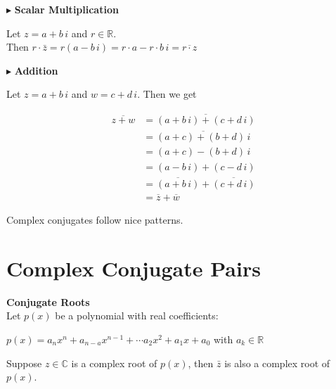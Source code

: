 \documentclass{ximera}
\begin{document}
$\blacktriangleright$ \textbf{Scalar Multiplication}


Let $z = a + b \, i$  and $r \in \mathbb{R}$. \\

Then $r \cdot \bar{z} = r(a - b \, i) = r \cdot a - r \cdot b \, i = \overline{r \cdot z}$







$\blacktriangleright$ \textbf{Addition}


Let $z = a + b \, i$ and $w = c + d \, i$.  Then we get


\begin{align*}
\overline{z + w} & = \overline{(a + b \, i) + (c + d \, i)}  \\
                & = \overline{(a + c) + (b + d) \, i}   \\
                & = (a + c) - (b + d) \, i  \\
                & = (a - b \, i) + (c - d \, i)   \\
                & = \overline{(a + b \, i)} + \overline{(c + d \, i)}  \\
                & = \overline{z} + \overline{w}
\end{align*}





Complex conjugates follow nice patterns. 

















\section*{Complex Conjugate Pairs}




\begin{theorem} \textbf{\textcolor{blue!55!black}{Conjugate Roots}}   \\



Let $p(x)$ be a polynomial with real coefficients:

$p(x) = a_n x^n + a_{n-a} x^{n-1} + \cdots a_2 x^2 + a_1 x + a_0$   with $a_k \in \mathbb{R}$

Suppose $z \in \mathbb{C}$ is a complex root of $p(x)$, then $\bar{z}$ is also a complex root of $p(x)$.


\end{theorem}
\end{document}
